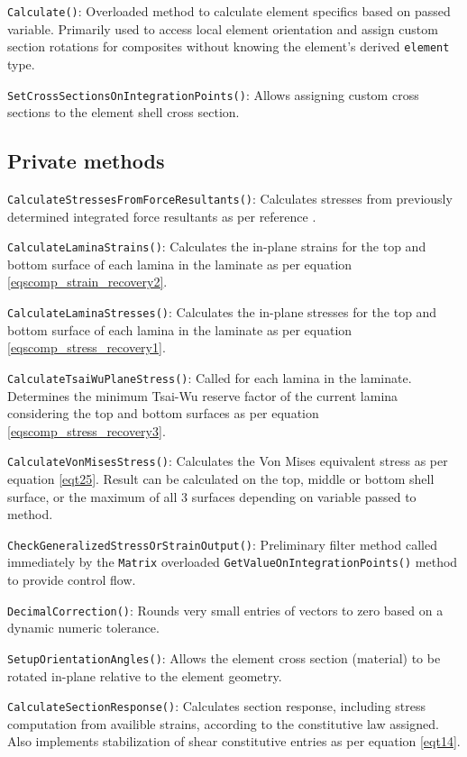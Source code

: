 \texttt{Calculate()}: Overloaded method to calculate element specifics based on passed variable. Primarily used to access local element orientation and assign custom section rotations for composites without knowing the element's derived \texttt{element} type.

\texttt{SetCrossSectionsOnIntegrationPoints()}: Allows assigning custom cross sections to the element shell cross section.

\subsection{Private methods}
\texttt{CalculateStressesFromForceResultants()}: Calculates stresses from previously determined integrated force resultants as per reference \cite{FelippaKirchhoff2017}.

\texttt{CalculateLaminaStrains()}: Calculates the in-plane strains for the top and bottom surface of each lamina in the laminate as per equation \ref{eqscomp_strain_recovery2}.

\texttt{CalculateLaminaStresses()}: Calculates the in-plane stresses for the top and bottom surface of each lamina in the laminate as per equation \ref{eqscomp_stress_recovery1}.

\texttt{CalculateTsaiWuPlaneStress()}: Called for each lamina in the laminate. Determines the minimum Tsai-Wu reserve factor of the current lamina considering the top and bottom surfaces as per equation \ref{eqscomp_stress_recovery3}.

\texttt{CalculateVonMisesStress()}: Calculates the Von Mises equivalent stress as per equation \ref{eqt25}. Result can be calculated on the top, middle or bottom shell surface, or the maximum of all 3 surfaces depending on variable passed to method.

\texttt{CheckGeneralizedStressOrStrainOutput()}: Preliminary filter method called immediately by the \texttt{Matrix} overloaded \texttt{GetValueOnIntegrationPoints()} method to provide control flow.

\texttt{DecimalCorrection()}: Rounds very small entries of vectors to zero based on a dynamic numeric tolerance.

\texttt{SetupOrientationAngles()}: Allows the element cross section (material) to be rotated in-plane relative to the element geometry.

\texttt{CalculateSectionResponse()}: Calculates section response, including stress computation from availible strains, according to the constitutive law assigned. Also implements stabilization of shear constitutive entries as per equation \ref{eqt14}.

